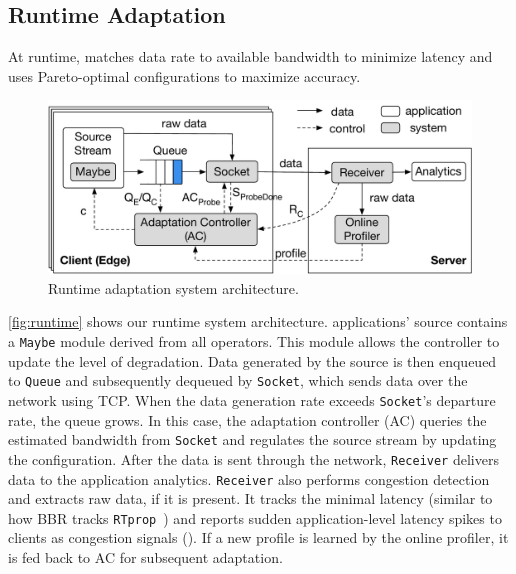 \subsection{Runtime Adaptation}
\label{sec:runtime}

At runtime, \sysname{} matches data rate to available bandwidth to minimize
latency and uses Pareto-optimal configurations to maximize accuracy.

\begin{figure}
  \centering
  \includegraphics[width=\linewidth]{figures/runtime-adaptation.pdf}
  \caption{Runtime adaptation system architecture.}
  \label{fig:runtime}
\end{figure}

\autoref{fig:runtime} shows our runtime system architecture. \sysname{}
applications' source contains a \texttt{Maybe} module derived from all \maybe{}
operators. This module allows the controller to update the level of
degradation. Data generated by the source is then enqueued to \texttt{Queue} and
subsequently dequeued by \texttt{Socket}, which sends data over the network
using TCP. When the data generation rate exceeds \texttt{Socket}'s departure
rate, the queue grows. In this case, the adaptation controller (AC) queries the
estimated bandwidth from \texttt{Socket} and regulates the source stream by
updating the configuration. After the data is sent through the network,
\texttt{Receiver} delivers data to the application analytics. \texttt{Receiver}
also performs congestion detection and extracts raw data, if it is present.  It
tracks the minimal latency (similar to how BBR tracks
\texttt{RTprop}~\cite{cardwell2017bbr}) and reports sudden application-level
latency spikes to clients as congestion signals (\rc{}). If a new profile is
learned by the online profiler, it is fed back to AC for subsequent adaptation.

